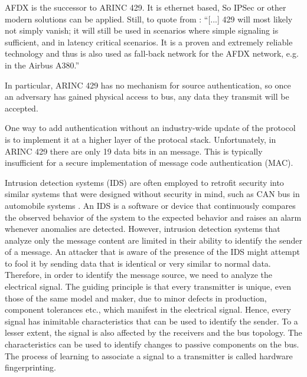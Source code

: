 \documentclass[conference]{IEEEtran}
\begin{document}
  AFDX is the successor to ARINC 429. It is ethernet based, So IPSec or other modern solutions can be applied. Still, to quote from \cite{fuchs2012evolution}: ``[...] 429 will most likely not simply vanish; it will still be used in scenarios where simple signaling is sufficient, and in latency critical scenarios. It is a proven and extremely reliable technology and thus is also used as fall-back network for the AFDX network, e.g. in the Airbus A380.''
  
  In particular, ARINC 429 has no mechanism for source authentication, so once an adversary has gained physical access to bus, any data they transmit will be accepted.
   
  One way to add authentication without an industry-wide update of the protocol is to implement it at a higher layer of the protocal stack. Unfortunately, in ARINC 429 there are only 19 data bits in an message. This is typically insufficient for a secure implementation of message code authentication (MAC).
  
  Intrusion detection systems (IDS) are often employed to retrofit security into similar systems that were designed without security in mind, such as CAN bus in automobile systems \cite{}. An IDS is a software or device that continuously compares the observed behavior of the system to the expected behavior and raises an alarm whenever anomalies are detected. However, intrusion detection systems that analyze only the message content are limited in their ability to identify the sender of a message.  An attacker that is aware of the presence of the IDS might attempt to fool it by sending data that is identical or very similar to normal data.  Therefore, in order to identify the message source, we need to analyze the electrical signal. The guiding principle is that every transmitter is unique, even those of the same model and maker, due to minor defects in production, component tolerances etc., which manifest in the electrical signal. Hence, every signal has inimitable characteristics that can be used to identify the sender. To a lesser extent, the signal is also affected by the receivers and the bus topology. The characteristics can be used to identify changes to passive components on the bus. The process of learning to associate a signal to a transmitter is called hardware fingerprinting.
  
\end{document}
